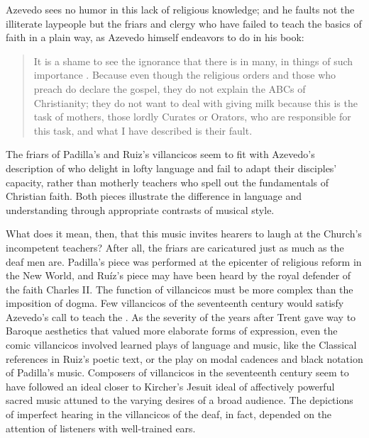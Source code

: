 Azevedo sees no humor in this lack of religious knowledge; and he faults not the
illiterate laypeople but the friars and clergy who have failed to teach the
basics of faith in a plain way, as Azevedo himself endeavors to do in his book:
\begin{quote}
    It is a shame to see the ignorance that there is in many, in things of such
    importance \Dots{}.
    Because even though the religious orders and those who preach do declare the
    gospel, they do not explain the ABCs  of Christianity;
    they do not want to deal with giving milk because this is the task of
    mothers, those lordly Curates or Orators, who are responsible for this task,
    and what I have described is their fault.%
        \Autocite
        [27: .] 
        {Azevedo:Catecismo}
\end{quote}
The friars of Padilla's and Ruiz's villancicos seem to fit with Azevedo's
description of  who delight in lofty language and fail to
adapt their disciples' capacity, rather than motherly teachers who spell out the
fundamentals of Christian faith.
Both pieces illustrate the difference in language and understanding through
appropriate contrasts of musical style.

What does it mean, then, that this music invites hearers to laugh at the
Church's incompetent teachers? 
After all, the friars are caricatured just as much as the deaf men are.
Padilla's piece was performed at the epicenter of religious reform in the New
World, and Ruíz's piece may have been heard by the royal defender of the faith
Charles II.  %
The function of villancicos must be more complex than the imposition of dogma.
Few villancicos of the seventeenth century would satisfy Azevedo's call to teach
the .  
As the severity of the years after Trent gave way to Baroque aesthetics that
valued more elaborate forms of expression, even the comic villancicos involved
learned plays of language and music, like the Classical references in Ruiz's
poetic text, or the play on modal cadences and black notation of Padilla's
music.
Composers of villancicos in the seventeenth century seem to have followed an
ideal closer to Kircher's Jesuit ideal of affectively powerful sacred music
attuned to the varying desires of a broad audience.
The depictions of imperfect hearing in the villancicos of the deaf, in fact,
depended on the attention of listeners with well-trained ears.


